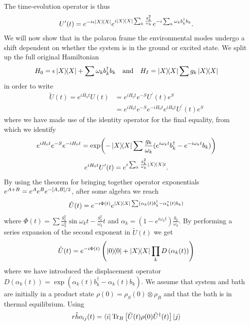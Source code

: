 \documentclass[]{article}
\begin{document}
The time-evolution operator is thus
\begin{equation}
U^{\prime}(t) = e^{-i\epsilon\dyad{X}} e^{i\dyad{X}\sum_{k}\frac{g^2_k}{\omega_k}} e^{-i\sum_{k}\omega_k b_k^{\dagger}b_k}.
\end{equation}
We will now show that in the polaron frame the environmental modes undergo a shift dependent on whether the system is in the ground or excited state. We split up the full original  Hamiltonian
\begin{equation}
H_0 = \epsilon \dyad{X} + \sum \omega_k b_k^{\dagger}b_k \quad \textnormal{and} \quad H_I = \dyad{X}\sum g_k \dyad{X}
\end{equation}
in order to write 
\begin{align}
\tilde{U}(t) = e^{i H_0 t}U(t) &= e^{i H_0 t}e^{-S}U^{\prime}(t)e^{S} \\
&= e^{i H_0 t}e^{-S}e^{-i H_0 t}e^{i H_0 t}U^{\prime}(t)e^{S}
\end{align}
where we have made use of the identity operator for the final equality, from which we identify
\begin{equation}
e^{i H_0 t}e^{-S}e^{-i H_0 t} = \exp(-\dyad{X}\sum\frac{g_k}{\omega_k}(e^{i\omega_k t}b_k^{\dagger} - e^{-i\omega_k t}b_k))
\end{equation}
\begin{equation}
e^{i H_0 t}U^{\prime}(t) = e^{i\sum_{k}\frac{g^2_k}{\omega_k}\dyad{X}t}.
\end{equation}
By using the theorem for bringing together operator exponentials $e^{A+B} = e^{A}e^Be^{-\comm{A}{B}/2}$, after some algebra we reach
\begin{equation}
\label{eq:compactTimeEvOp}
\tilde{U}(t) = e^{-i\Phi(t)}e^{\dyad{X}\sum(\alpha_k(t)b_k^{\dagger}-\alpha_k^*(t)b_k)}
\end{equation}
where $\Phi(t) = \sum\frac{g^2_k}{\omega_k^2}\sin{\omega_k t}-\frac{g_k^2}{\omega_k}t$ and $\alpha_k=(1-e^{i\omega_k t})\frac{g_k}{\omega_k}$. By performing a series expansion of the second exponent in $\tilde{U}(t)$ we get
\begin{equation}
\tilde{U}(t) = e^{-i\Phi(t)}\left(\dyad{0} + \dyad{X}\prod_{k} D\left(\alpha_k(t)\right)\right) 
\end{equation}
where we have introduced the displacement operator $D(\alpha_k(t))=\exp(\alpha_k(t)b_k^{\dagger}-\alpha_k(t)b_k)$. We assume that system and bath are initially in a product state $\rho(0) = \rho_S(0)\otimes\rho_B$ and that the bath is in thermal equilibrium. Using
\begin{equation}
\tilde{rho}_{ij}(t) = \bra{i}\Tr_B\left[\tilde{U}(t)\rho(0)\tilde{U}^{\dagger}(t)\right]\ket{j}
\end{equation}
\end{document}
